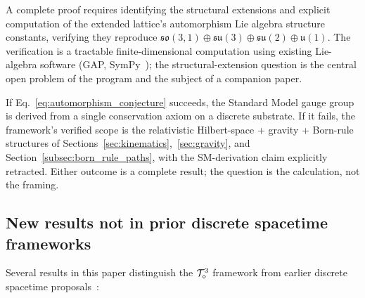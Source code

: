 A complete proof requires identifying the structural extensions and
explicit computation of the extended lattice's automorphism Lie
algebra structure constants, verifying they reproduce $\mathfrak{so}
(3,1) \oplus \mathfrak{su}(3) \oplus \mathfrak{su}(2) \oplus
\mathfrak{u}(1)$.  The verification is a tractable finite-dimensional
computation using existing Lie-algebra software (GAP,
SymPy~\cite{sympy_lie}); the structural-extension question is the
central open problem of the program and the subject of a companion
paper.

If Eq.~\eqref{eq:automorphism_conjecture} succeeds, the Standard Model
gauge group is derived from a single conservation axiom on a discrete
substrate.  If it fails, the framework's verified scope is the
relativistic Hilbert-space + gravity + Born-rule structures of
Sections~\ref{sec:kinematics},~\ref{sec:gravity}, and
Section~\ref{subsec:born_rule_paths}, with the SM-derivation claim
explicitly retracted.  Either outcome is a complete result; the
question is the calculation, not the framing.

\subsection*{New results not in prior discrete spacetime frameworks}

Several results in this paper distinguish the $\mathcal{T}_\diamond^3$ framework
from earlier discrete spacetime proposals~\cite{bombelli1987,
thooft2016, wolfram2002, zuse1969}:

